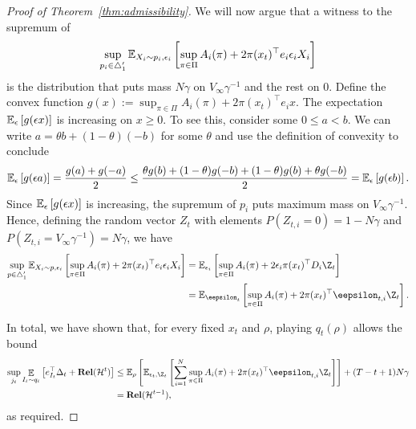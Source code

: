 \documentclass{article}
\newcommand{\rel}{\mathbf{Rel}}
\newcommand{\hist}{{\mathcal H}}
\begin{document}
\begin{proof}[Proof of Theorem~\ref{thm:admissibility}]
We will now argue that a witness to the supremum of 
\begin{align*}
    \sup_{p_i\in\triangle_1'}
  \mathbb E_{X_i\sim p_i,\epsilon_i}\left[
        \sup_{\pi\in\Pi} A_i(\pi)+
        2\pi(x_t)^\top e_i \epsilon_i X_i
        \right]
\end{align*}
is the distribution that puts mass $N\gamma$ on $V_\infty\gamma^{-1}$ and the rest on $0$. Define the convex function 
$g(x) :=  \sup_{\pi\in\Pi} A_i(\pi)+ 2\pi(x_t)^\top e_i x$. The expectation $\mathbb E_{\epsilon}\left[ g(\epsilon x)\right]$ is increasing on $x\geq 0$. To see this, consider some $0\leq a<b$. We can write $a = \theta b + (1-\theta)(-b)$ for some $\theta$ and use the definition of convexity to conclude 
 \begin{align*}
   \mathbb E_{\epsilon}\left[ g(\epsilon a) \right]
   = 
   \frac{g(a)+g(-a)}{2}
   \leq
   \frac{\theta g(b)+(1-\theta)g(-b)
   +(1-\theta) g(b)+\theta g(-b)
   }{2}
   =
   \mathbb E_{\epsilon}\left[ g(\epsilon b) \right].
 \end{align*}
 Since $\mathbb E_{\epsilon}\left[ g(\epsilon x)\right]$ is increasing, the supremum of $p_i$ puts maximum mass on $V_\infty\gamma^{-1}$. Hence, defining the random vector $Z_{t}$ with elements $P(Z_{t,i} = 0) = 1-N\gamma$ and $P( Z_{t,i} = V_\infty\gamma^{-1}) = N\gamma$, we have
 \begin{align*}
    \sup_{p\in\triangle_1'}
  \ex_{X_i\sim p,\epsilon_i}\left[
        \sup_{\pi\in\Pi} A_i(\pi)+
        2\pi(x_t)^\top e_i \epsilon_i X_i
        \right]
   &=
  \ex_{\epsilon_i}\left[
        \sup_{\pi\in\Pi} A_i(\pi)+
        2\epsilon_i\pi(x_t)^\top D_i \Z_t
   \right]\\
      &=
  \ex_{\eepsilon_t}\left[
        \sup_{\pi\in\Pi} A_i(\pi)+
        2\pi(x_t)^\top \eepsilon_{t,i} \Z_t
        \right].
\end{align*}

In total, we have shown that, for every fixed $x_t$ and $\rho$, playing $q_t(\rho)$ allows the bound
\begin{align*}
    \sup_{j_t} \mathop{\ex}_{I_t\sim q_t}\left[ e_{I_t}^\top \Delta_t
  + \rel(\hist^t)\right]
  &\leq
    \ex_\rho \left[
  \ex_{\epsilon_t, \Z_t}\left[
  \sum_{i=1}^N
        \sup_{\pi\in\Pi} A_i(\pi)+
        2\pi(x_t)^\top \eepsilon_{t,i} \Z_t
  \right]
  \right]
  + (T-t+1)N\gamma\\
  &=
  \rel(\hist^{t-1}),
\end{align*}
as required.
\end{proof}
\end{document}
